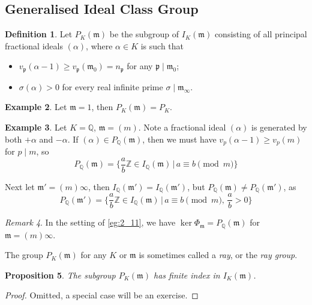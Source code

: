 \documentclass[11pt]{article}
\theoremstyle{definition}
\newtheorem{definition}{Definition}[section]
\newtheorem{example}[definition]{Example}
\theoremstyle{plain}
\newtheorem{proposition}[definition]{Proposition}
\theoremstyle{remark}
\newtheorem{remark}[definition]{Remark}
\newcommand{\ZZ}{\mathbb{Z}}
\newcommand{\QQ}{\mathbb{Q}}
\newcommand{\fp}{\mathfrak{p}}
\newcommand{\fm}{\mathfrak{m}}
\begin{document}
\subsection{Generalised Ideal Class Group}

\begin{definition}\label{def:2_12}
    Let $P_K(\fm)$ be the subgroup of $I_K(\fm)$ consisting of all principal fractional ideals $(\alpha)$, where $\alpha \in K$ is such that
    \begin{itemize}
        \item $v_\fp(\alpha - 1) \ge v_\fp(\fm_0) = n_\fp$ for any $\fp \mid \fm_0$;
        \item $\sigma(\alpha) > 0$ for every real infinite prime $\sigma \mid \fm_\infty$.
    \end{itemize}
\end{definition}

\begin{example}\label{eg:2_13}
    Let $\fm = 1$, then $P_K(\fm) = P_K$.
\end{example}

\begin{example}\label{eg:2_14}
    Let $K = \QQ$, $\fm = (m)$. Note a fractional ideal $(\alpha)$ is generated by both $+\alpha$ and $-\alpha$. If $(\alpha) \in P_\QQ(\fm)$, then we must have $v_p(\alpha - 1) \ge v_p(m)$ for $p \mid m$, so
    \begin{equation*}
        P_\QQ(\fm) = \bigg\{\frac{a}{b}\ZZ \in I_\QQ(\fm) \,\big\vert\, a \equiv b \pmod{m}\bigg\}
    \end{equation*}

    \noindent Next let $\fm' = (m) \infty$, then $I_\QQ(\fm') = I_\QQ(\fm')$, but $P_\QQ(\fm) \neq P_\QQ(\fm')$, as
    \begin{equation*}
        P_\QQ(\fm') = \bigg\{\frac{a}{b}\ZZ \in I_\QQ(\fm) \,\big\vert\, a \equiv b \pmod{m},\, \frac{a}{b} > 0\bigg\}
    \end{equation*}
\end{example}

\begin{remark}\label{remark:2_15}
    In the setting of \autoref{eg:2_11}, we have $\ker \Phi_\fm = P_\QQ(\fm)$ for $\fm = (m) \infty$.
\end{remark}

The group $P_K(\fm)$ for any $K$ or $\fm$ is sometimes called a \emph{ray}, or the \emph{ray group}.

\begin{proposition}\label{prop:2_16}
    The subgroup $P_K(\fm)$ has finite index in $I_K(\fm)$.
\end{proposition}
\begin{proof}
    Omitted, a special case will be an exercise.
\end{proof}
\end{document}
